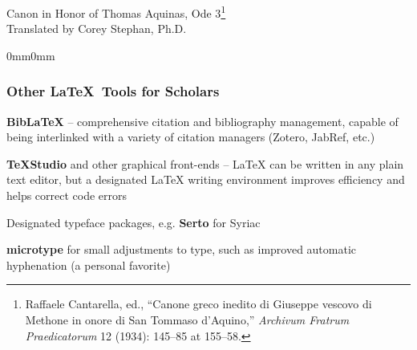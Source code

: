 \documentclass{beamer}
\begin{document}
\begin{frame}[fragile]

{\small Canon in Honor of Thomas Aquinas, Ode 3}\footnote{Raffaele Cantarella, ed., “Canone greco inedito di Giuseppe vescovo di Methone in onore di San Tommaso d’Aquino,” \emph{Archivum Fratrum Praedicatorum} 12 (1934): 145--85 at 155--58.} \\
{\small Translated by Corey Stephan, Ph.D.} \break

{\scriptsize \begin{Parallel}{0mm}{0mm}
	\textgreek{}
		\ParallelPar
	\textgreek{}
		\ParallelPar
	\textgreek{}
		\ParallelPar
	\textgreek{}
		\ParallelPar
	\textgreek{}
		\ParallelPar
	\textgreek{}
		\ParallelPar
	\textgreek{}
		\ParallelPar
	\vspace{1em}
	\textgreek{}
		\ParallelPar
	\textgreek{}
		\ParallelPar
	\textgreek{}
		\ParallelPar
	\textgreek{}
		\ParallelPar
	\textgreek{}
		\ParallelPar
	\textgreek{}
		\ParallelPar
	\textgreek{}
		\ParallelPar
\end{Parallel}}	

\end{frame}

\begin{frame}
	\frametitle[Other \LaTeX\ software]{Other \LaTeX\ Tools for Scholars}

\textbf{BibLaTeX} -- comprehensive citation and bibliography management, capable of being interlinked with a variety of citation managers (Zotero, JabRef, etc.) \break

\textbf{TeXStudio} and other graphical front-ends -- LaTeX can be written in any plain text editor, but a designated LaTeX writing environment improves efficiency and helps correct code errors \break

Designated typeface packages, e.g. \textbf{Serto} for Syriac \break

\textbf{microtype} for small adjustments to type, such as improved automatic hyphenation (a personal favorite)

\end{frame}
\end{document}

